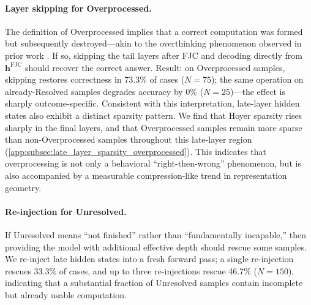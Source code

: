 \paragraph{Layer skipping for Overprocessed.}
The definition of Overprocessed implies that a correct computation was formed but subsequently destroyed---akin to the overthinking phenomenon observed in prior work \citep{halawi2024overthinking, schuster2022confident}. If so, skipping the tail layers after FJC and decoding directly from $\mathbf{h}^{\mathrm{FJC}}$ should recover the correct answer. Result: on Overprocessed samples, skipping restores correctness in 73.3\% of cases ($N=75$); the same operation on already-Resolved samples degrades accuracy by 0\% ($N=25$)---the effect is sharply outcome-specific.
Consistent with this interpretation, late-layer hidden states also exhibit a distinct sparsity pattern. We find that Hoyer sparsity rises sharply in the final layers, and that Overprocessed samples remain more sparse than non-Overprocessed samples throughout this late-layer region (\cref{app:subsec:late_layer_sparsity_overprocessed}). This indicates that overprocessing is not only a behavioral ``right-then-wrong'' phenomenon, but is also accompanied by a measurable compression-like trend in representation geometry.

\paragraph{Re-injection for Unresolved.}
If Unresolved means ``not finished'' rather than ``fundamentally incapable,'' then providing the model with additional effective depth should rescue some samples. We re-inject late hidden states into a fresh forward pass; a single re-injection rescues 33.3\% of cases, and up to three re-injections rescue 46.7\% ($N=150$), indicating that a substantial fraction of Unresolved samples contain incomplete but already usable computation.

